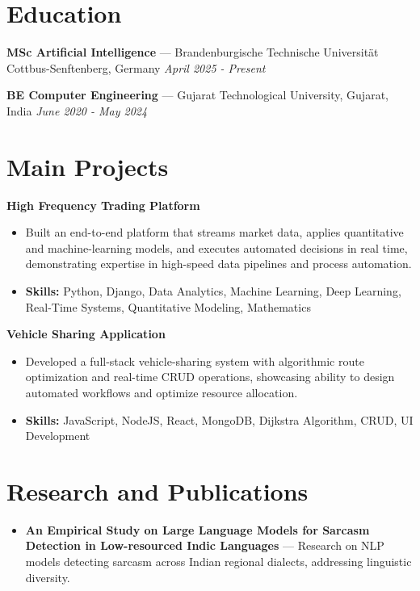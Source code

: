 \documentclass[a4paper,10pt]{article}
\begin{document}
\section*{Education}
\textbf{MSc Artificial Intelligence} — Brandenburgische Technische Universität Cottbus-Senftenberg, Germany \hfill \textit{April 2025 - Present}\par
\vspace{1.5pt}
\textbf{BE Computer Engineering} — Gujarat Technological University, Gujarat, India \hfill \textit{June 2020 - May 2024}\par

\section*{Main Projects}
\textbf{High Frequency Trading Platform}\par
\vspace{1pt}
\begin{itemize}
  \item Built an end-to-end platform that streams market data, applies quantitative and machine-learning models, and executes automated decisions in real time, demonstrating expertise in high-speed data pipelines and process automation.
  \item \textbf{Skills:} Python, Django, Data Analytics, Machine Learning, Deep Learning, Real-Time Systems, Quantitative Modeling, Mathematics
\end{itemize}
\vspace{3pt}
\textbf{Vehicle Sharing Application}\par
\vspace{1pt}
\begin{itemize}
  \item Developed a full-stack vehicle-sharing system with algorithmic route optimization and real-time CRUD operations, showcasing ability to design automated workflows and optimize resource allocation.
  \item \textbf{Skills:} JavaScript, NodeJS, React, MongoDB, Dijkstra Algorithm, CRUD, UI Development
\end{itemize}

\section*{Research and Publications}
\begin{itemize}
\item \textbf{An Empirical Study on Large Language Models for Sarcasm Detection in Low-resourced Indic Languages} — Research on NLP models detecting sarcasm across Indian regional dialects, addressing linguistic diversity.
\end{itemize}
\end{document}
